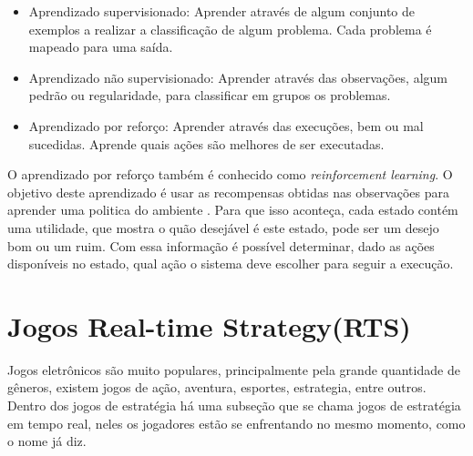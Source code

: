 \begin{itemize}
	\item Aprendizado supervisionado: Aprender através de algum conjunto de exemplos a realizar a classificação de algum problema. Cada problema é mapeado para uma saída. 
	\item Aprendizado não supervisionado: Aprender através das observações, algum pedrão ou regularidade, para classificar em grupos os problemas.
	\item Aprendizado por reforço: Aprender através das execuções, bem ou mal sucedidas. Aprende quais ações são melhores de ser executadas.
\end{itemize}



O aprendizado por reforço também é conhecido como \textit{reinforcement learning}. O objetivo deste aprendizado é usar as recompensas obtidas nas observações para aprender uma politica do ambiente \cite{intelligence2003modern}. Para que isso aconteça, cada estado contém uma utilidade, que mostra o quão desejável é este estado, pode ser um desejo bom ou um ruim. Com essa informação é possível determinar, dado as ações disponíveis no estado, qual ação o sistema deve escolher para seguir a execução. 




\section{Jogos Real-time Strategy(RTS)} 

Jogos eletrônicos são muito populares, principalmente pela grande quantidade de gêneros, existem jogos de ação, aventura, esportes, estrategia, entre outros. Dentro dos jogos de estratégia há uma subseção que se chama jogos de estratégia em tempo real, neles os jogadores estão se enfrentando no mesmo momento, como o nome já diz. \\

